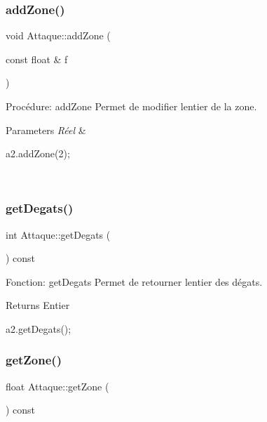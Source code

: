 \subsubsection{\texorpdfstring{add\+Zone()}{addZone()}}
{\footnotesize\ttfamily void Attaque\+::add\+Zone (\begin{DoxyParamCaption}\item[{const float \&}]{f }\end{DoxyParamCaption})}



Procédure\+: add\+Zone Permet de modifier l\textquotesingle{}entier de la zone. 


\begin{DoxyParams}{Parameters}
{\em Réel} & 
\begin{DoxyCode}
a2.addZone(2);
\end{DoxyCode}
 \\
\hline
\end{DoxyParams}
\mbox{\label{classAttaque_aa98722a177e1f01df81dd6bf8fc88799}} 
\subsubsection{\texorpdfstring{get\+Degats()}{getDegats()}}
{\footnotesize\ttfamily int Attaque\+::get\+Degats (\begin{DoxyParamCaption}{ }\end{DoxyParamCaption}) const}



Fonction\+: get\+Degats Permet de retourner l\textquotesingle{}entier des dégats. 

\begin{DoxyReturn}{Returns}
Entier 
\begin{DoxyCode}
a2.getDegats();
\end{DoxyCode}
 
\end{DoxyReturn}
\mbox{\label{classAttaque_a09a146b30b7df667382ef5884dc2635a}} 
\subsubsection{\texorpdfstring{get\+Zone()}{getZone()}}
{\footnotesize\ttfamily float Attaque\+::get\+Zone (\begin{DoxyParamCaption}{ }\end{DoxyParamCaption}) const}



